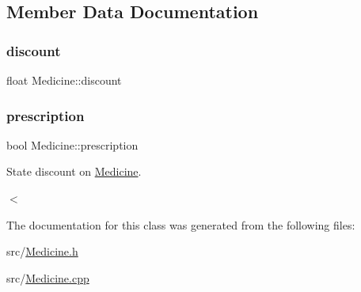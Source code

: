 \subsection{Member Data Documentation}
\mbox{\label{classMedicine_a56e42f35d8edce81983df5837b6fee54}} 
\subsubsection{\texorpdfstring{discount}{discount}}
{\footnotesize\ttfamily float Medicine\+::discount\hspace{0.3cm}{\ttfamily [private]}}

\mbox{\label{classMedicine_a10737b485d7f6e8b208ae5e26299333d}} 
\subsubsection{\texorpdfstring{prescription}{prescription}}
{\footnotesize\ttfamily bool Medicine\+::prescription\hspace{0.3cm}{\ttfamily [private]}}



State discount on \hyperlink{classMedicine}{Medicine}. 

$<$ 

The documentation for this class was generated from the following files\+:\begin{DoxyCompactItemize}
\item 
src/\hyperlink{Medicine_8h}{Medicine.\+h}\item 
src/\hyperlink{Medicine_8cpp}{Medicine.\+cpp}\end{DoxyCompactItemize}
